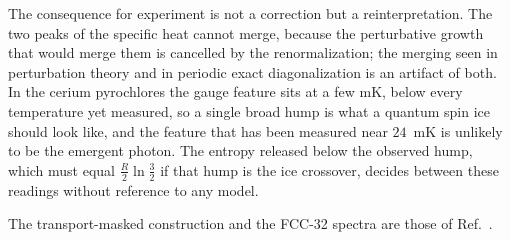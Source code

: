 \documentclass[aps,prb,preprint,amsmath,amssymb,superscriptaddress,
longbibliography,floatfix]{revtex4-2}
\begin{document}
The consequence for experiment is not a correction but a reinterpretation.  The
two peaks of the specific heat cannot merge, because the perturbative growth
that would merge them is cancelled by the renormalization; the merging seen in
perturbation theory and in periodic exact diagonalization is an artifact of
both.  In the cerium pyrochlores the gauge feature sits at a few mK, below
every temperature yet measured, so a single broad hump is what a quantum spin
ice should look like, and the feature that has been measured near $24$~mK is
unlikely to be the emergent photon.  The entropy released below the observed
hump, which must equal $\tfrac{R}{2}\ln\tfrac32$ if that hump is the ice
crossover, decides between these readings without reference to any model.

\begin{acknowledgments}
The transport-masked construction and the FCC-32 spectra are those of
Ref.~\cite{ZhouKimMask}.
\end{acknowledgments}



\end{document}
